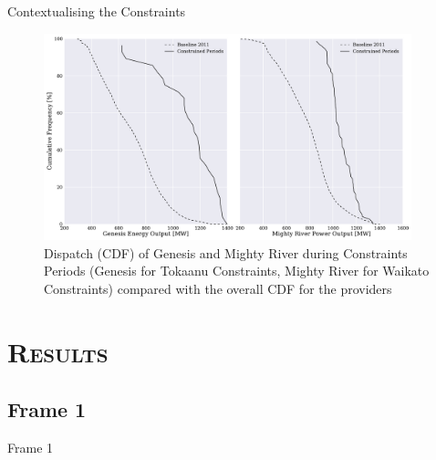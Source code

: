 \documentclass[xcolor=x11names,compress]{beamer}
\renewcommand{\(}{\begin{columns}}
\renewcommand{\)}{\end{columns}}
\newcommand{\<}[1]{\begin{column}{#1}}
\renewcommand{\>}{\end{column}}
\begin{document}
\begin{frame}{Contextualising the Constraints}
\begin{figure}
\includegraphics[width=0.95\textwidth]{img/gen_mrp_output_vs_baseline.pdf}
\caption{Dispatch (CDF) of Genesis and Mighty River during Constraints Periods
(Genesis for Tokaanu Constraints, Mighty River for Waikato Constraints)
compared with the overall CDF for the providers}
\end{figure}
\end{frame}

\section{\scshape Results}
\subsection{Frame 1}
\begin{frame}{Frame 1}

\end{frame}
\end{document}
